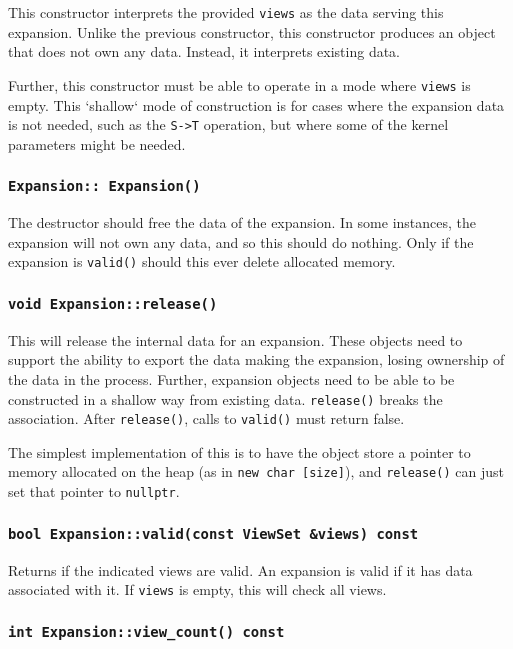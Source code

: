 This constructor interprets the provided \texttt{views} as the data serving
this expansion. Unlike the previous constructor, this constructor produces an
object that does not own any data. Instead, it interprets existing data.

Further, this constructor must be able to operate in a mode where \texttt{views}
is empty. This `shallow` mode of construction is for cases where the
expansion data is not needed, such as the \texttt{S->T} operation, but where
some of the kernel parameters might be needed.

\subsubsection{\texttt{Expansion::~Expansion()}}

The destructor should free the data of the expansion. In some instances, the
expansion will not own any data, and so this should do nothing. Only if the
expansion is \texttt{valid()} should this ever delete allocated memory.

\subsubsection{\texttt{void Expansion::release()}}

This will release the internal data for an expansion. These objects need to
support the ability to export the data making the expansion, losing ownership
of the data in the process. Further, expansion objects need to be able to be
constructed in a shallow way from existing data. \texttt{release()} breaks the
association. After \texttt{release()}, calls to \texttt{valid()} must return
false.

The simplest implementation of this is to have the object store a pointer to
memory allocated on the heap (as in \texttt{new char [size]}), and
\texttt{release()} can just set that pointer to \texttt{nullptr}.

\subsubsection{\texttt{bool Expansion::valid(const ViewSet \&views) const}}

Returns if the indicated views are valid. An expansion is valid if it has
data associated with it. If \texttt{views} is empty, this will check all
views.

\subsubsection{\texttt{int Expansion::view\_count() const}}

